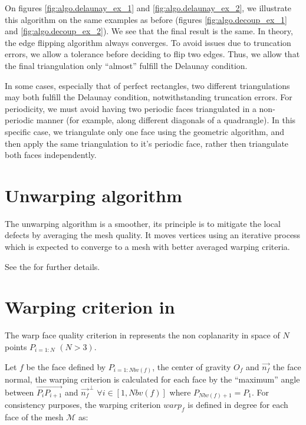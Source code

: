 On figures \ref{fig:algo.delaunay_ex_1} and \ref{fig:algo.delaunay_ex_2},
we illustrate this algorithm on the same examples as before (figures
\ref{fig:algo.decoup_ex_1} and \ref{fig:algo.decoup_ex_2}). We see that
the final result is the same. In theory, the edge flipping algorithm
always converges. To avoid issues due to truncation errors, we allow
a tolerance before deciding to flip two edges. Thus, we allow that the
final triangulation only ``almost'' fulfill the Delaunay condition.

In some cases, especially that of perfect rectangles, two different
triangulations may both fulfill the Delaunay condition, notwithstanding
truncation errors. For periodicity, we must avoid having two periodic
faces triangulated in a non-periodic manner (for example, along
different diagonals of a quadrangle). In this specific case, we
triangulate only one face using the geometric algorithm, and then
apply the same triangulation to it's periodic face, rather then
triangulate both faces independently.

\section*{Unwarping algorithm\label{sec:unwarping}}

\hypertarget{unwarp}{}

The unwarping algorithm is a smoother, its
principle is to mitigate the local defects by averaging
the mesh quality. It moves vertices using an iterative
process which is expected to converge to a mesh with better averaged
warping criteria.

See the  for further details.

\section*{Warping criterion in \CS\label{sec:warping_criterion}}
The warp face quality criterion in \CS represents the non coplanarity
in space of $N$ points $P_{i=1:N}$ $(N > 3)$.

Let $f$ be the face defined by $P_{i=1:Nbv(f)}$, the center
of gravity $O_{f}$ and $\overrightarrow{n_{f}}$ the face normal, the warping
criterion is calculated for each face by the ``maximum'' angle between
$\overrightarrow{P_{i}P_{i+1}}$ and $\overrightarrow{n_{f}}^{\perp}$
$\forall i\in [1,Nbv(f)]$ where $P_{Nbv(f)+1} = P_{1}$. For consistency
purposes, the warping criterion $warp_{f}$ is defined in degree for each
face of the mesh $\mathcal{M}$ as:

